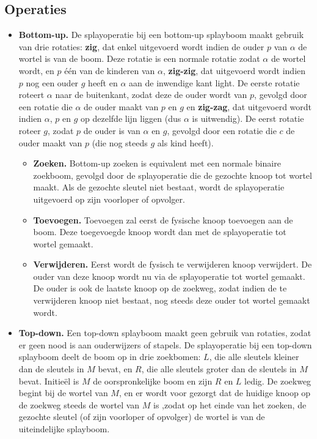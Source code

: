 \documentclass{report}
\begin{document}
		\subsection{Operaties}
	\begin{itemize}
\item \textbf{Bottom-up.} De splayoperatie bij een bottom-up splayboom maakt gebruik van drie rotaties:
 \textbf{zig}, dat enkel uitgevoerd wordt indien de ouder $p$ van $\alpha$ de wortel is van de boom. Deze rotatie is een normale rotatie zodat $\alpha$ de wortel wordt, en $p$ één van de kinderen van $\alpha$, \textbf{zig-zig}, dat uitgevoerd wordt indien $p$ nog een ouder $g$ heeft en $\alpha$ aan de inwendige kant light. De eerste rotatie roteert $\alpha$ naar de buitenkant, zodat deze de ouder wordt van $p$, gevolgd door een rotatie die $\alpha$ de ouder maakt van $p$ en $g$ en \textbf{zig-zag}, dat uitgevoerd wordt indien $\alpha$, $p$ en $g$ op dezelfde lijn liggen (dus $\alpha$ is uitwendig). De eerst rotatie roteer $g$, zodat $p$ de ouder is van $\alpha$ en $g$, gevolgd door een rotatie die $c$ de ouder maakt van $p$ (die nog steeds $g$ als kind heeft).
	
			\begin{itemize}
				\item \textbf{Zoeken.} Bottom-up zoeken is equivalent met een normale binaire zoekboom, gevolgd door de splayoperatie die de gezochte knoop tot wortel maakt. Als de gezochte sleutel niet bestaat, wordt de splayoperatie uitgevoerd op zijn voorloper of opvolger.
				\item \textbf{Toevoegen.} Toevoegen zal eerst de fysische knoop toevoegen aan de boom. Deze toegevoegde knoop wordt dan met de splayoperatie tot wortel gemaakt.
				\item \textbf{Verwijderen.} Eerst wordt de fysisch te verwijderen knoop verwijdert. De ouder van deze knoop wordt nu via de splayoperatie tot wortel gemaakt. De ouder is ook de laatste knoop op de zoekweg, zodat indien de te verwijderen knoop niet bestaat, nog steeds deze ouder tot wortel gemaakt wordt.
			\end{itemize}
		\item \textbf{Top-down.} Een top-down splayboom maakt geen gebruik van rotaties, zodat er geen nood is aan ouderwijzers of stapels. De splayoperatie bij een top-down splayboom deelt de boom op in drie zoekbomen: $L$, die alle sleutels kleiner dan de sleutels in $M$ bevat, en $R$, die alle sleutels groter dan de sleutels in $M$ bevat. Initieël is $M$ de oorspronkelijke boom en zijn $R$ en $L$ ledig. De zoekweg begint bij de wortel van $M$, en er wordt voor gezorgt dat de huidige knoop op de zoekweg steeds de wortel van $M$ is ,zodat op het einde van het zoeken, de gezochte sleutel (of zijn voorloper of opvolger) de wortel is van de uiteindelijke splayboom.
		

\end{itemize}
\end{document}

